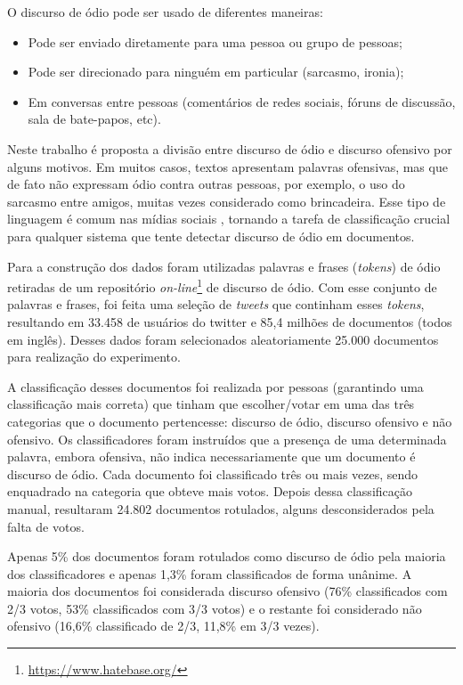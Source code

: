 O discurso de ódio pode ser usado de diferentes maneiras: 
\begin{itemize}
    \item Pode ser enviado diretamente para uma pessoa ou grupo de pessoas;
    \item Pode ser direcionado para ninguém em particular (sarcasmo, ironia);
    \item Em conversas entre pessoas (comentários de redes sociais, fóruns de discussão, sala de bate-papos, etc).
\end{itemize}

Neste trabalho é proposta a divisão entre discurso de ódio e discurso ofensivo por alguns motivos. Em muitos casos, textos apresentam palavras ofensivas, mas que de fato não expressam ódio contra outras pessoas, por exemplo, o uso do sarcasmo entre amigos, muitas vezes considerado como brincadeira. Esse tipo de linguagem é comum nas mídias sociais \cite{kwok2013locate}, tornando a tarefa de classificação crucial para qualquer sistema que tente detectar discurso de ódio em documentos.

Para a construção dos dados foram utilizadas palavras e frases (\textit{tokens}) de ódio retiradas de um repositório \textit{on-line}\footnote{\url{https://www.hatebase.org/}} de discurso de ódio. Com esse conjunto de palavras e frases, foi feita uma seleção de \textit{tweets} que continham esses \textit{tokens}, resultando em 33.458 de usuários do twitter e 85,4 milhões de documentos (todos em inglês). Desses dados foram selecionados aleatoriamente 25.000 documentos para realização do experimento.

A classificação desses documentos foi realizada por pessoas (garantindo uma classificação mais correta) que tinham que escolher/votar em uma das três categorias que o documento pertencesse: discurso de ódio, discurso ofensivo e não ofensivo. Os classificadores foram instruídos que a presença de uma determinada palavra, embora ofensiva, não indica necessariamente que um documento é discurso de ódio. Cada documento foi classificado três ou mais vezes, sendo enquadrado na categoria que obteve mais votos. Depois dessa classificação manual, resultaram 24.802 documentos rotulados, alguns desconsiderados pela falta de votos.

Apenas 5\% dos documentos foram rotulados como discurso de ódio pela maioria dos classificadores e apenas 1,3\% foram classificados de forma unânime. A maioria dos documentos foi considerada discurso ofensivo (76\% classificados com 2/3 votos, 53\% classificados com 3/3 votos) e o restante foi considerado não ofensivo (16,6\% classificado de 2/3, 11,8\% em 3/3 vezes).

